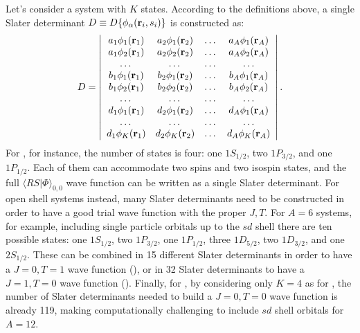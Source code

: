 \documentclass[aps,prc,twocolumn,superscriptaddress,floatfix]{revtex4-1}
\begin{document}
Let's consider a system with $K$ states. According to the definitions above, 
a single Slater determinant $D\equiv D\{\phi_\alpha(\vb{r}_i,s_i)\}$ is constructed as:
\begin{align}
D=
\left|
\begin{array}{cccc}
a_1\phi_1(\vb{r}_1) & a_2\phi_1(\vb{r}_2) & \dots & a_A\phi_1(\vb{r}_A) \\
a_1\phi_2(\vb{r}_1) & a_2\phi_2(\vb{r}_2) & \dots & a_A\phi_2(\vb{r}_A) \\
\dots & \dots & \dots & \dots \\
b_1\phi_1(\vb{r}_1) & b_2\phi_1(\vb{r}_2) & \dots & b_A\phi_1(\vb{r}_A) \\
b_1\phi_2(\vb{r}_1) & b_2\phi_2(\vb{r}_2) & \dots & b_A\phi_2(\vb{r}_A) \\
\dots & \dots & \dots & \dots \\
d_1\phi_1(\vb{r}_1) & d_2\phi_1(\vb{r}_2) & \dots & d_A\phi_1(\vb{r}_A) \\
\dots & \dots & \dots & \dots \\
d_1\phi_K(\vb{r}_1) & d_2\phi_K(\vb{r}_2) & \dots & d_A\phi_K(\vb{r}_A) \\
\end{array}
\right| . 
\end{align}
For , for instance, the number of states is four: 
one $1S_{1/2}$, two $1P_{3/2}$, and one $1P_{1/2}$. Each of them
can accommodate two spins and two isospin states, and the full 
$\langle RS|\Phi\rangle_{0,0}$
wave function can be written as a single Slater determinant. 
For open shell systems instead, many Slater determinants need to be 
constructed in order to have a good trial wave function with the proper $J,T$. 
For $A=6$ systems, for example, including single particle orbitals up to the 
$sd$ shell there are ten possible states: 
one $1S_{1/2}$, two $1P_{3/2}$, one $1P_{1/2}$, three $1D_{5/2}$, 
two $1D_{3/2}$, and one $2S_{1/2}$. These can be combined in 15
different Slater determinants in order to have a $J=0,T=1$ wave function 
(), or in 32 Slater determinants to have a $J=1,T=0$
wave function (). Finally, for , by 
considering only $K=4$ as for , the number of Slater
determinants needed to build a $J=0,T=0$ wave function is already 119, 
making computationally challenging to include $sd$ shell orbitals for $A=12$.
\end{document}
